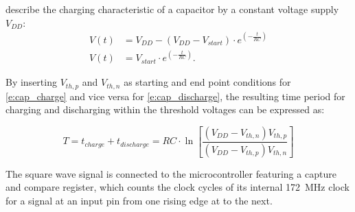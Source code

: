  describe the charging characteristic of a capacitor by a constant voltage supply $V_{DD}$:
\begin{subequations}
    \begin{align}
        V(t) &= V_{DD} - (V_{DD} - V_{start})\cdot e^{(-\frac{t}{RC})} \label{e:cap_charge}\\
        V(t) &= V_{start} \cdot e^{(-\frac{t}{RC})} \label{e:cap_discharge}.
    \end{align}
\end{subequations}

By inserting $V_{th,p}$ and $V_{th,n}$ as starting and end point conditions for \cref{e:cap_charge} and vice versa for \cref{e:cap_discharge}, the resulting time period for charging and discharging within the threshold voltages can be expressed as:

\begin{equation}
    \label{e:cap_period}
    T = t_{charge} + t_{discharge} = RC \cdot \ln\left[ \frac{(V_{DD}-V_{th,n})V_{th,p}}{(V_{DD}-V_{th,p})V_{th,n}}\right]
\end{equation}

The square wave signal is connected to the microcontroller featuring a capture and compare register, which counts the clock cycles of its internal \qty{172}{\mega\Hz} clock for a signal at an input pin from one rising edge at to the next.

